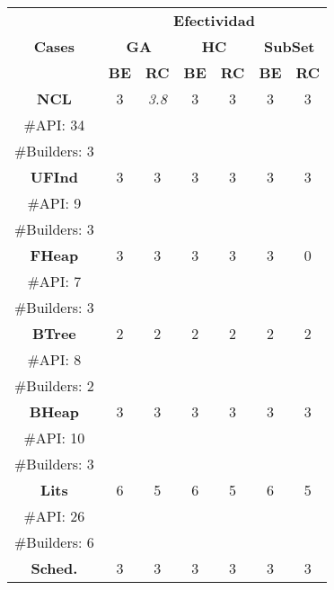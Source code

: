 \begin{table}[H]
\centering
\label{tab:t1}
\scriptsize
\begin{tabular}{|c c|cc|cc|cc|}
\midrule
\multicolumn{2}{|c|}{\multirow{3}{*}{\textbf{Cases}}} & \multicolumn{6}{c|}{\textbf{Efectividad}} \\
\cline{3-8}
\multicolumn{2}{|c|}{} & \multicolumn{2}{c}{\textbf{GA}} & \multicolumn{2}{c}{\textbf{HC}} & \multicolumn{2}{c|}{\textbf{SubSet}} \\
\multicolumn{2}{|c|}{} & \textbf{\tiny{BE}} & \textbf{\tiny{RC}} & \textbf{\tiny{BE}} & \textbf{\tiny{RC}} & \textbf{\tiny{BE}} & \textbf{\tiny{RC}} \\
\midrule
\multicolumn{2}{|c|}{\textbf{NCL}} & 3  &   \cellcolor{gray!25} \emph{3.8} & 3 &  3 &3 &  3 \\
\multicolumn{2}{|c|}{\tiny \#API: 34} &  &   & &   & & \\
\multicolumn{2}{|c|}{\tiny \#Builders: 3} &  &   & &   & & \\

\midrule
\multicolumn{2}{|c|}{\textbf{UFInd}}& 3 & 3  & 3  & 3  &3   & 3     \\
\multicolumn{2}{|c|}{\tiny \#API: 9} &  &   & &   & & \\
\multicolumn{2}{|c|}{\tiny \#Builders: 3} &  &   & &   & & \\
\midrule

\multicolumn{2}{|c|}{\textbf{FHeap}}& 3 & 3  &  3 &  3 &  3 &  0   \\
\multicolumn{2}{|c|}{\tiny \#API: 7} &  &   & &   & & \\
\multicolumn{2}{|c|}{\tiny \#Builders: 3} &  &   & &   & & \\
\midrule
\multicolumn{2}{|c|}{\textbf{BTree}} & 2 & 2  &  2 &  2 &  2 &  2  \\
\multicolumn{2}{|c|}{\tiny \#API: 8} &  &   & &   & & \\
\multicolumn{2}{|c|}{\tiny \#Builders: 2} &  &   & &   & & \\
\midrule
\multicolumn{2}{|c|}{\textbf{BHeap}}& 3 & 3 &  3 &  3 &  3 &  3   \\
\multicolumn{2}{|c|}{\tiny \#API: 10} &  &   & &   & & \\
\multicolumn{2}{|c|}{\tiny \#Builders: 3} &  &   & &   & & \\
\midrule
\multicolumn{2}{|c|}{\textbf{Lits}} &  6 & 5 & 6 &  5  & 6  &5   \\
\multicolumn{2}{|c|}{\tiny \#API: 26} &  &   & &   & & \\
\multicolumn{2}{|c|}{\tiny \#Builders: 6} &  &   & &   & & \\
\midrule
\multicolumn{2}{|c|}{\textbf{Sched.}} &  3 & 3   & 3  &  3&  3 & 3 \\


\end{tabular}
\end{table}
